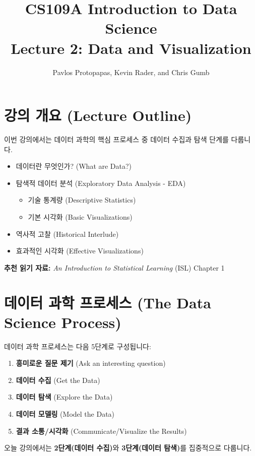 \documentclass[12pt,a4paper]{article}
\title{\textbf{CS109A Introduction to Data Science\\Lecture 2: Data and Visualization}}
\author{Pavlos Protopapas, Kevin Rader, and Chris Gumb}
\date{}
\begin{document}
\maketitle
\tableofcontents
\newpage

\section{강의 개요 (Lecture Outline)}

이번 강의에서는 데이터 과학의 핵심 프로세스 중 데이터 수집과 탐색 단계를 다룹니다.

\begin{itemize}
    \item 데이터란 무엇인가? (What are Data?)
    \item 탐색적 데이터 분석 (Exploratory Data Analysis - EDA)
    \begin{itemize}
        \item 기술 통계량 (Descriptive Statistics)
        \item 기본 시각화 (Basic Visualizations)
    \end{itemize}
    \item 역사적 고찰 (Historical Interlude)
    \item 효과적인 시각화 (Effective Visualizations)
\end{itemize}

\textbf{추천 읽기 자료:} \textit{An Introduction to Statistical Learning} (ISL) Chapter 1

\section{데이터 과학 프로세스 (The Data Science Process)}

데이터 과학 프로세스는 다음 5단계로 구성됩니다:

\begin{enumerate}
    \item \textbf{흥미로운 질문 제기} (Ask an interesting question)
    \item \textbf{데이터 수집} (Get the Data)
    \item \textbf{데이터 탐색} (Explore the Data)
    \item \textbf{데이터 모델링} (Model the Data)
    \item \textbf{결과 소통/시각화} (Communicate/Visualize the Results)
\end{enumerate}

오늘 강의에서는 \textbf{2단계(데이터 수집)}와 \textbf{3단계(데이터 탐색)}를 집중적으로 다룹니다.
\end{document}
